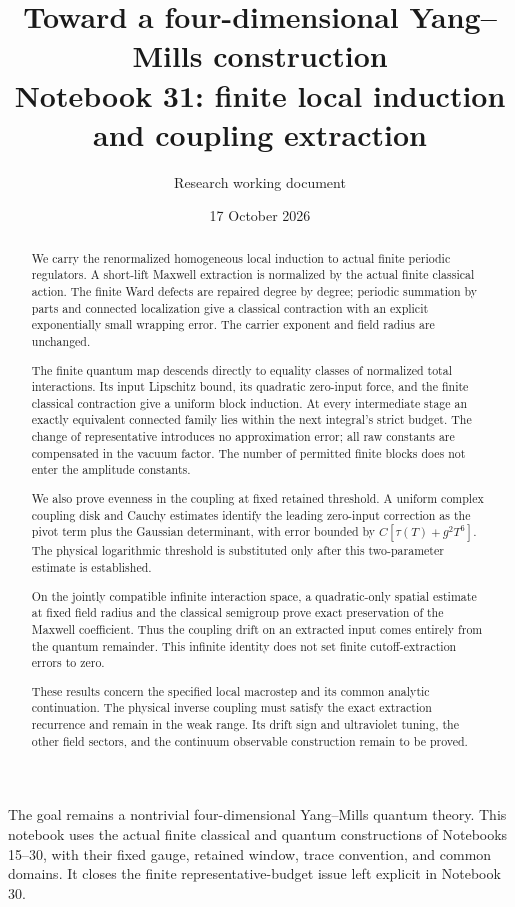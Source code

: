\documentclass[11pt]{article}
\title{Toward a four-dimensional Yang--Mills construction\\
\large Notebook 31: finite local induction and coupling extraction}
\author{Research working document}
\date{17 October 2026}
\theoremstyle{remark}
\begin{document}
\maketitle
\begin{abstract}
We carry the renormalized homogeneous local induction to actual
finite periodic regulators. A short-lift Maxwell extraction is
normalized by the actual finite classical action. The finite Ward
defects are repaired degree by degree; periodic summation by parts
and connected localization give a classical contraction with an
explicit exponentially small wrapping error. The carrier exponent
and field radius are unchanged.

The finite quantum map descends directly to equality classes of
normalized total interactions. Its input Lipschitz bound, its
quadratic zero-input force, and the finite classical contraction
give a uniform block induction. At every intermediate stage an
exactly equivalent connected family lies within the next integral's
strict budget. The change of representative introduces no
approximation error; all raw constants are compensated in the
vacuum factor. The number of permitted finite blocks does not
enter the amplitude constants.

We also prove evenness in the coupling at fixed retained threshold.
A uniform complex coupling disk and Cauchy estimates identify the
leading zero-input correction as the pivot term plus the Gaussian
determinant, with error bounded by
\(C[\tau(T)+g^2T^6]\). The physical logarithmic threshold is substituted
only after this two-parameter estimate is established.

On the jointly compatible infinite interaction space, a
quadratic-only spatial estimate at fixed field radius and the
classical semigroup prove exact preservation of the Maxwell
coefficient. Thus the coupling drift on an extracted input
comes entirely from the quantum remainder. This infinite
identity does not set finite cutoff-extraction errors to zero.

These results concern the specified local macrostep and its common
analytic continuation. The physical inverse coupling must satisfy
the exact extraction recurrence and remain in the weak range.
Its drift sign and ultraviolet tuning, the other field sectors,
and the continuum observable construction remain to be proved.
\end{abstract}

The goal remains a nontrivial four-dimensional Yang--Mills quantum
theory. This notebook uses the actual finite classical and quantum
constructions of Notebooks 15--30, with their fixed gauge, retained
window, trace convention, and common domains. It closes the finite
representative-budget issue left explicit in Notebook 30.
\end{document}
